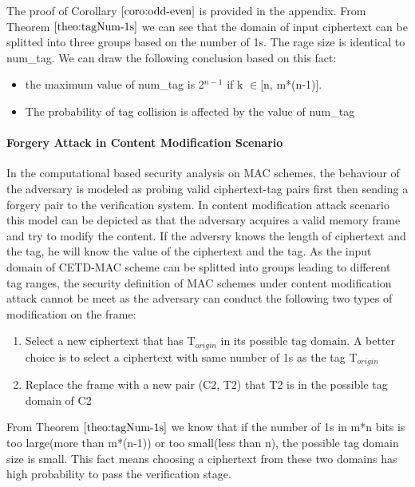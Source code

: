 The proof of Corollary $\ref{coro:odd-even}$ is provided in the appendix. 
From Theorem $\ref{theo:tagNum-1s}$ we can see that the domain of input ciphertext can be splitted into three groups based on the number of 1s. The rage size is identical to num\_tag. We can draw the following conclusion based on this fact:
\begin{itemize}
	\item the maximum value of num\_tag is 2$^{n-1}$ if k $\in$[n, m*(n-1)]. 
	\item The probability of tag collision is affected by the value of num\_tag
\end{itemize}
\paragraph{Forgery Attack in Content Modification Scenario}
In the computational based security analysis on MAC schemes, the behaviour of the adversary is modeled as probing valid ciphertext-tag pairs first then sending a forgery pair to the verification system. In content modification attack scenario this model can be depicted as that the adversary acquires a valid memory frame and try to modify the content. If the adversry knows the length of ciphertext and the tag, he will know the value of the ciphertext and the tag. 
As the input domain of CETD-MAC scheme can be splitted into groups leading to different tag ranges, the security definition of MAC schemes under content modification attack cannot be meet as the adversary can conduct the following two types of modification on the frame:
\begin{enumerate}
	\item Select a new ciphertext that has T$_{origin}$ in its possible tag domain. A better choice is to select a ciphertext with same number of 1s as the tag T$_{origin}$
	\item Replace the frame with a new pair (C2, T2) that T2 is in the possible tag domain of C2
\end{enumerate}
From Theorem $\ref{theo:tagNum-1s}$ we know that if the number of 1s in m*n bits is too large(more than m*(n-1)) or too small(less than n), the possible tag domain size is small. This fact means choosing a ciphertext from these two domains has high probability to pass the verification stage.

